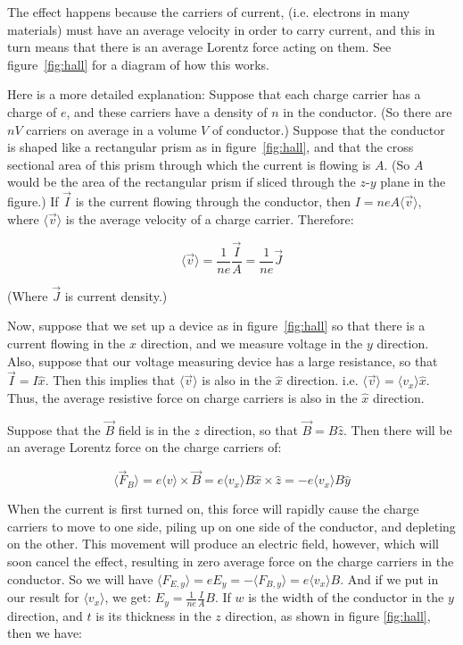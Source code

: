 \documentclass[]{article}
\newcommand{\avval}[1]{\langle #1 \rangle}
\begin{document}
The effect happens because the carriers of current, (i.e. electrons in many materials) must have an average velocity in order to carry current, and this in turn means that there is an average Lorentz force acting on them. See figure~\ref{fig:hall} for a diagram of how this works.

Here is a more detailed explanation: Suppose that each charge carrier has a charge of $e$, and these carriers have a density of $n$ in the conductor. (So there are $nV$ carriers on average in a volume $V$ of conductor.) Suppose that the conductor is shaped like a rectangular prism as in figure~\ref{fig:hall}, and that the cross sectional area of this prism through which the current is flowing is $A$. (So $A$ would be the area of the rectangular prism if sliced through the $z$-$y$ plane in the figure.) If $\vec I$ is the current flowing through the conductor, then $I = neA\avval{\vec  v}$, where $\avval{\vec  v}$ is the average velocity of a charge carrier. Therefore:

$$
\avval {\vec  v} = \frac{1}{ne}\frac{\vec I}{A} = \frac{1}{ne} \vec J
$$

(Where $\vec J$ is current density.)

Now, suppose that we set up a device as in figure~\ref{fig:hall} so that there is a current flowing in the $x$ direction, and we measure voltage in the $y$ direction. Also, suppose that our voltage measuring device has a large resistance, so that $\vec I = I \hat x$. Then this implies that $\avval{\vec v}$ is also in the $\hat x$ direction. i.e. $\avval{\vec v} = \avval{v_x}\hat x$. Thus, the average resistive force on charge carriers is also in the $\hat x$ direction.

Suppose that the $\vec B$ field is in the $z$ direction, so that $\vec B = B\hat z$. Then there will be an average Lorentz force on the charge carriers of:

$$
\avval {\vec F_B} = e \avval v \times \vec B = e \avval{v_x} B \hat x \times \hat z = - e \avval{v_x} B \hat y
$$

When the current is first turned on, this force will rapidly cause the charge carriers to move to one side, piling up on one side of the conductor, and depleting on the other. This movement will produce an electric field, however, which will soon cancel the effect, resulting in zero average force on the charge carriers in the conductor. So we will have $\avval {F_{E,y}} = eE_y = -\avval{F_{B,y}} = e \avval{v_x} B$. And if we put in our result for $\avval {v_x}$, we get: $E_y =  \frac{1}{ne}\frac{I}{A} B$. If $w$ is the width of the conductor in the $y$ direction, and $t$ is its thickness in the $z$ direction, as shown in figure \ref{fig:hall}, then we have:
\end{document}
